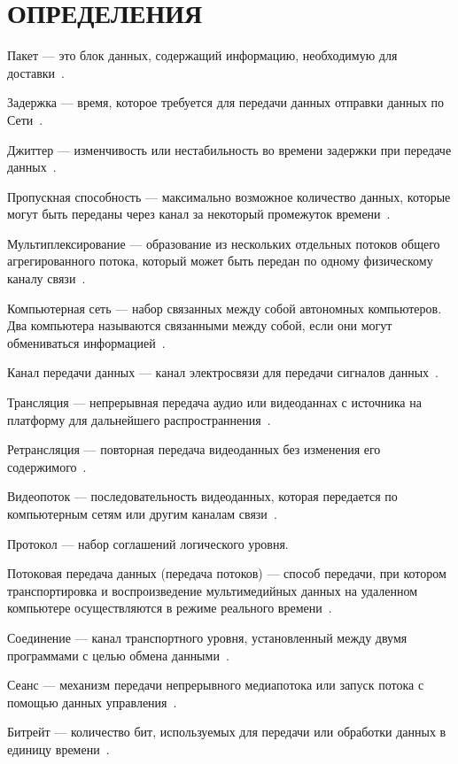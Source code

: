 \chapter*{ОПРЕДЕЛЕНИЯ}

\begin{description}[leftmargin=0pt]
	\item Пакет --- это блок данных, содержащий информацию, необходимую для доставки~\cite{tcp_ip_reilly}.
	\item Задержка --- время, которое требуется для передачи данных отправки данных по Сети~\cite{tcp_ip_reilly}. 
	\item Джиттер --- изменчивость или нестабильность во времени задержки при передаче данных~\cite{tcp_ip_reilly}.
	\item Пропускная способность --- максимально возможное количество данных, которые могут быть переданы через канал за некоторый промежуток времени~\cite{tcp_ip_reilly}.
	\item Мультиплексирование  --- образование из нескольких отдельных потоков общего агрегированного потока, который может быть передан по одному физическому каналу связи~\cite{tcp_ip_lora}.
	\item Компьютерная сеть --- набор связанных между собой автономных компьютеров. Два компьютера называются связанными между собой, если они могут обмениваться информацией~\cite{network_tanenbaum}.
	\item Канал передачи данных --- канал электросвязи для передачи сигналов данных~\cite{network_tanenbaum}.
	\item Трансляция  --- непрерывная передача аудио или видеоданнах с источника на платформу для дальнейшего распространнения~\cite{basic_stream_protocls}.
	\item Ретрансляция --- повторная передача видеоданных без изменения его содержимого~\cite{basic_stream_protocls}.
	\item Видеопоток --- последовательность видеоданных, которая передается по компьютерным сетям или другим каналам связи~\cite{basic_stream_protocls}.
	\item Протокол --- набор соглашений логического уровня.
	\item Потоковая передача данных (передача потоков) --- способ передачи, при котором транспортировка и воспроизведение мультимедийных данных на удаленном компьютере осуществляются в режиме реального времени~\cite{basic_stream_protocls}. 

	\item Соединение --- канал транспортного уровня, установленный между двумя программами с целью обмена данными~\cite{rfc_rtsp}.
	\item Сеанс --- механизм передачи непрерывного медиапотока или запуск потока с помощью данных управления~\cite{rfc_rtsp}.
	\item Битрейт --- количество бит, используемых для передачи или обработки данных в единицу времени~\cite{hls_apple}.
\end{description}

